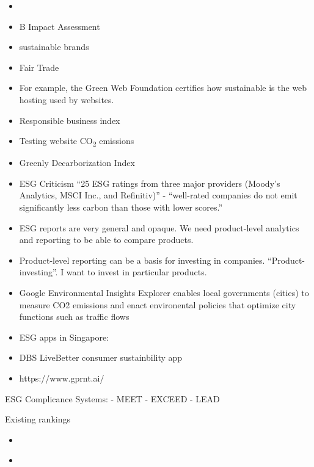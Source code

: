 \documentclass[
  letterpaper,
  DIV=11,
  numbers=noendperiod]{scrartcl}
\providecommand{\tightlist}{%
  \setlength{\itemsep}{0pt}\setlength{\parskip}{0pt}}\usepackage{longtable,booktabs,array}
\begin{document}
\begin{itemize}
\item
  \citet{EthicalConsumer}
\item
  B Impact Assessment
\item
  sustainable brands
\item
  Fair Trade
\item
  \citet{GreenWebFoundation2023} For example, the Green Web Foundation
  certifies how sustainable is the web hosting used by websites.
\item
  \citet{EstonianResponsibleBusiness} Responsible business index
\item
  Testing website CO\textsubscript{2} emissions
  \citet{wholegraindigitaHowDoesIt2023}
\item
  Greenly Decarborization Index
  \citet{greenlyGreenlyIntroducesClimate2023}
\item
  ESG Criticism ``25 ESG ratings from three major providers (Moody's
  Analytics, MSCI Inc., and Refinitiv)'' - ``well-rated companies do not
  emit significantly less carbon than those with lower scores.''
\item
  ESG reports are very general and opaque. We need product-level
  analytics and reporting to be able to compare products.
\item
  Product-level reporting can be a basis for investing in companies.
  ``Product-investing''. I want to invest in particular products.
\item
  Google Environmental Insights Explorer enables local governments
  (cities) to measure CO2 emissions and enact environental policies that
  optimize city functions such as traffic flows
  \citep{MethodologyGoogleEnvironmental, nicolelombardoReducingCityTransport2021}
\item
  ESG apps in Singapore:
\item
  DBS LiveBetter consumer sustainbility app
  \citep{dbssingaporeDBSLiveBetter, dbsDBSLaunchesSingapore2018}
\item
  https://www.gprnt.ai/
\end{itemize}

ESG Complicance Systems: - MEET - EXCEED - LEAD

Existing rankings

\begin{itemize}
\tightlist
\item
  \citet{earth.orgWorld50Most2022}
\item
  \citet{staff2021Global1002021}
\end{itemize}
\end{document}
